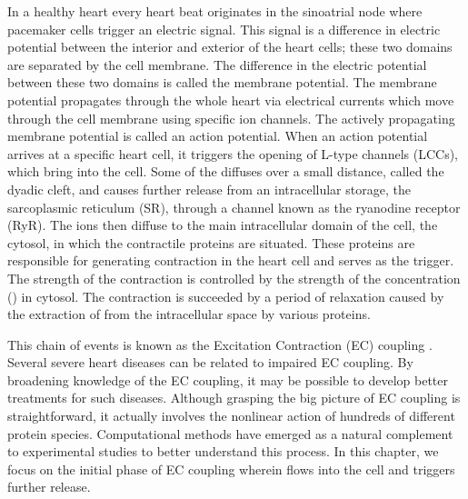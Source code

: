 In a healthy heart every heart beat originates in the sinoatrial node
where pacemaker cells trigger an electric signal. This signal is a
difference in electric potential between the interior and exterior of
the heart cells; these two domains are separated by the cell
membrane. The difference in the electric potential between these two
domains is called the membrane potential. The membrane potential
propagates through the whole heart via electrical currents which move
through the cell membrane using specific ion channels. The actively
propagating membrane potential is called an action potential. When an
action potential arrives at a specific heart cell, it triggers the
opening of L-type \Ca channels (LCCs), which bring \Ca into the
cell. Some of the \Ca diffuses over a small distance, called the
dyadic cleft, and causes further \Ca release from an intracellular \Ca
storage, the sarcoplasmic reticulum (SR), through a channel known as
the ryanodine receptor (RyR). The \Ca ions then diffuse to the main
intracellular domain of the cell, the cytosol, in which the
contractile proteins are situated. These proteins are responsible for
generating contraction in the heart cell and \Ca serves as the
trigger. The strength of the contraction is controlled by the strength
of the \Ca concentration (\CaC) in cytosol. The contraction is
succeeded by a period of relaxation caused by the extraction of \Ca
from the intracellular space by various proteins.

This chain of events is known as the Excitation Contraction (EC)
coupling \citep{Bers2001}. Several severe heart diseases can be related
to impaired EC coupling. By broadening knowledge of the EC coupling,
it may be possible to develop better treatments for such
diseases. Although grasping the big picture of EC coupling is
straightforward, it actually involves the nonlinear action of hundreds
of different protein species. Computational methods have emerged as a
natural complement to experimental studies to better understand this
process. In this chapter, we focus on the initial phase of EC
coupling wherein \Ca flows into the cell and triggers further \Ca
release.

